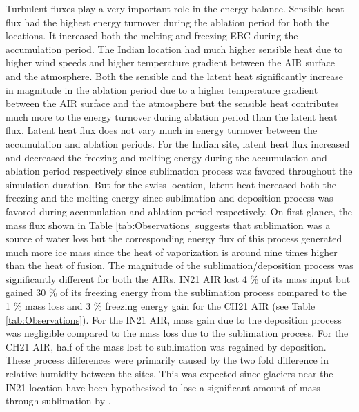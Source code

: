 \documentclass[utf8]{frontiersSCNS}
\begin{document}
Turbulent fluxes play a very important role in the energy balance. Sensible heat flux had the highest energy
turnover during the ablation period for both the locations. It increased both the melting and freezing EBC
during the accumulation period. The Indian location had much higher sensible heat due to higher wind speeds and
higher temperature gradient between the AIR surface and the atmosphere. Both the sensible and the latent heat
significantly increase in magnitude in the ablation period due to a higher temperature gradient between the AIR
surface and the atmosphere but the sensible heat contributes much more to the energy turnover during ablation
period than the latent heat flux. Latent heat flux does not vary much in energy turnover between the
accumulation and ablation periods. For the Indian site, latent heat flux increased and decreased the freezing
and melting energy during the accumulation and ablation period respectively since sublimation process was
favored throughout the simulation duration. But for the swiss location, latent heat increased both the freezing
and the melting energy since sublimation and deposition process was favored during accumulation and ablation
period respectively. On first glance, the mass flux shown in Table \ref{tab:Observations} suggests that
sublimation was a source of water loss but the corresponding energy flux of this process generated much more ice
mass since the heat of vaporization is around nine times higher than the heat of fusion. The magnitude of the
sublimation/deposition process was significantly different for both the AIRs.  IN21 AIR lost 4 \% of its mass
input but gained 30 \% of its freezing energy from the sublimation process compared to the 1 \% mass loss and 3
\% freezing energy gain for the CH21 AIR (see Table \ref{tab:Observations}). For the IN21 AIR, mass gain due to
the deposition process was negligible compared to the mass loss due to the sublimation process. For the CH21
AIR, half of the mass lost to sublimation was regained by deposition. These process differences were primarily
caused by the two fold difference in relative humidity between the sites. This was expected since glaciers near
the IN21 location have been hypothesized to lose a significant amount of mass through sublimation by
\cite{azam_2018}.
\end{document}
